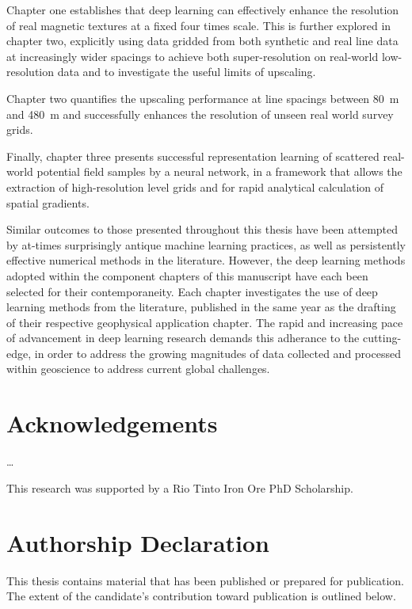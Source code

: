 \documentclass[12pt,a4paper]{report} %
\begin{document}
Chapter one establishes that deep learning can effectively enhance the resolution of real magnetic textures at a fixed four times scale.
This is further explored in chapter two, explicitly using data gridded from both synthetic and real line data at increasingly wider spacings to achieve both super-resolution on real-world low-resolution data and to investigate the useful limits of upscaling.

Chapter two quantifies the upscaling performance at line spacings between \SI{80}{\m} and \SI{480}{\m} and successfully enhances the resolution of unseen real world survey grids.

Finally, chapter three presents successful representation learning of scattered real-world potential field samples by a neural network, in a framework that allows the extraction of high-resolution level grids and for rapid analytical calculation of spatial gradients.

Similar outcomes to those presented throughout this thesis have been attempted by at-times surprisingly antique machine learning practices, as well as persistently effective numerical methods in the literature.
However, the deep learning methods adopted within the component chapters of this manuscript have each been selected for their contemporaneity.
Each chapter investigates the use of deep learning methods from the literature, published in the same year as the drafting of their respective geophysical application chapter.
The rapid and increasing pace of advancement in deep learning research demands this adherance to the cutting-edge, in order to address the growing magnitudes of data collected and processed within geoscience to address current global challenges.

\tableofcontents{}

\section{Acknowledgements}
\dots{}

This research was supported by a Rio Tinto Iron Ore PhD Scholarship.

\section{Authorship Declaration}
This thesis contains material that has been published or prepared for publication.
The extent of the candidate's contribution toward publication is outlined below.
\end{document}
